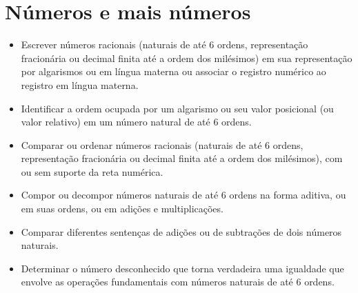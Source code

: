 \chapter{Números e mais números}



\begin{itemize}
\item Escrever números racionais (naturais de até 6 ordens, representação
fracionária ou decimal finita até a ordem dos milésimos) em sua
representação por algarismos ou em língua materna ou associar o registro
numérico ao registro em língua materna.

\item Identificar a ordem ocupada por um algarismo ou seu valor posicional
(ou valor relativo) em um número natural de até 6 ordens.

\item Comparar ou ordenar números racionais (naturais de até 6 ordens,
representação fracionária ou decimal finita até a ordem dos milésimos),
com ou sem suporte da reta numérica.

\item Compor ou decompor números naturais de até 6 ordens na forma aditiva,
ou em suas ordens, ou em adições e multiplicações.

\item Comparar diferentes sentenças de adições ou de subtrações de dois números naturais.

\item Determinar o número desconhecido que torna verdadeira uma igualdade
que envolve as operações fundamentais com números naturais de até 6
ordens.
\end{itemize}


